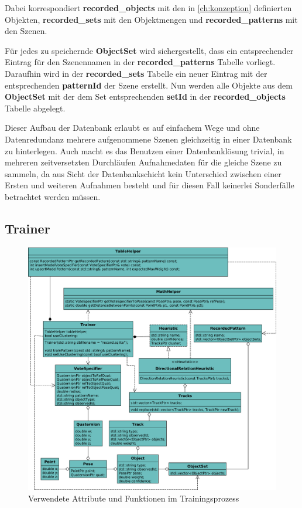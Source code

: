 Dabei korrespondiert \textbf{recorded\_objects} mit den in \vref{ch:konzeption} definierten Objekten, \textbf{recorded\_sets} mit den Objektmengen und \textbf{recorded\_patterns} mit den Szenen.

Für jedes zu speichernde \textbf{ObjectSet} wird sichergestellt, dass ein entsprechender Eintrag für den Szenennamen in der \textbf{recorded\_patterns} Tabelle vorliegt.
Daraufhin wird in der \textbf{recorded\_sets} Tabelle ein neuer Eintrag mit der entsprechenden \textbf{patternId} der Szene erstellt.
Nun werden alle Objekte aus dem \textbf{ObjectSet} mit der dem Set entsprechenden \textbf{setId} in der \textbf{recorded\_objects} Tabelle abgelegt. 

Dieser Aufbau der Datenbank erlaubt es auf einfachem Wege und ohne Datenredundanz mehrere aufgenommene Szenen gleichzeitig in einer Datenbank zu hinterlegen.
Auch macht es das Benutzen einer Datenbanklösung trivial, in mehreren zeitversetzten Durchläufen Aufnahmedaten für die gleiche Szene zu sammeln, da aus Sicht der Datenbankschicht kein Unterschied zwischen einer Ersten und weiteren Aufnahmen besteht und für diesen Fall keinerlei Sonderfälle betrachtet werden müssen.

\subsection{Trainer}\label{ch:impl-training}

\begin{figure}
  \centering
  \includegraphics[width=1.0\textwidth]{uml/trainer.pdf}
  \caption{Verwendete Attribute und Funktionen im Trainingsprozess}
  \label{fig:training}
\end{figure}

